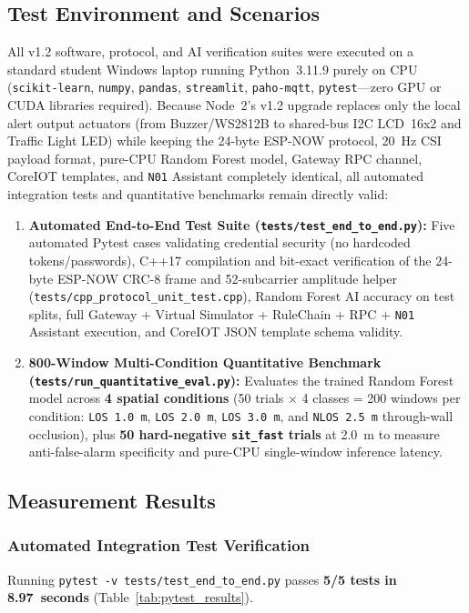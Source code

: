 \documentclass{hcmut-report}
\begin{document}
\subsection{Test Environment and Scenarios}
All v1.2 software, protocol, and AI verification suites were executed on a standard student Windows laptop running Python~3.11.9 purely on CPU (\texttt{scikit-learn}, \texttt{numpy}, \texttt{pandas}, \texttt{streamlit}, \texttt{paho-mqtt}, \texttt{pytest}—zero GPU or CUDA libraries required). Because Node~2's v1.2 upgrade replaces only the local alert output actuators (from Buzzer/WS2812B to shared-bus I2C LCD~16x2 and Traffic Light LED) while keeping the 24-byte ESP-NOW protocol, 20~Hz CSI payload format, pure-CPU Random Forest model, Gateway RPC channel, CoreIOT templates, and \texttt{N01} Assistant completely identical, all automated integration tests and quantitative benchmarks remain directly valid:
\begin{enumerate}
  \item \textbf{Automated End-to-End Test Suite (\texttt{tests/test\_end\_to\_end.py}):} Five automated Pytest cases validating credential security (no hardcoded tokens/passwords), C++17 compilation and bit-exact verification of the 24-byte ESP-NOW CRC-8 frame and 52-subcarrier amplitude helper (\texttt{tests/cpp\_protocol\_unit\_test.cpp}), Random Forest AI accuracy on test splits, full Gateway + Virtual Simulator + RuleChain + RPC + \texttt{N01} Assistant execution, and CoreIOT JSON template schema validity.
  \item \textbf{800-Window Multi-Condition Quantitative Benchmark (\texttt{tests/\allowbreak run\_quantitative\_eval.py}):} Evaluates the trained Random Forest model across \textbf{4 spatial conditions} (50 trials $\times$ 4 classes = 200 windows per condition: \texttt{LOS 1.0~m}, \texttt{LOS 2.0~m}, \texttt{LOS 3.0~m}, and \texttt{NLOS 2.5~m} through-wall occlusion), plus \textbf{50 hard-negative \texttt{sit\_fast} trials} at 2.0~m to measure anti-false-alarm specificity and pure-CPU single-window inference latency.
\end{enumerate}

\subsection{Measurement Results}

\subsubsection{Automated Integration Test Verification}
Running \texttt{pytest -v tests/test\_end\_to\_end.py} passes \textbf{5/5 tests in 8.97~seconds} (Table~\ref{tab:pytest_results}).
\end{document}
